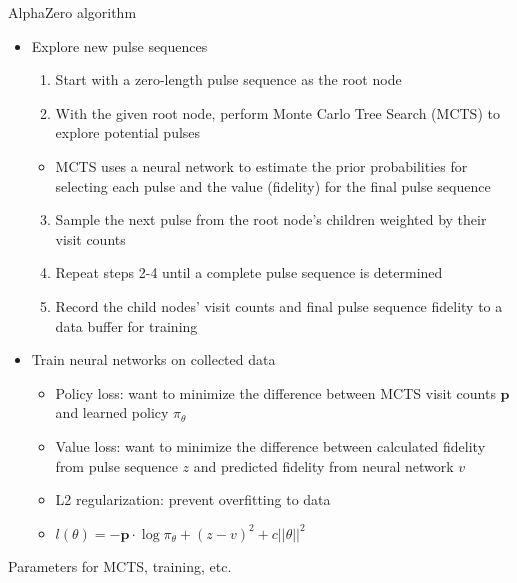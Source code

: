 \documentclass{beamer}
\begin{document}
\begin{frame}{AlphaZero algorithm}

\begin{itemize}

\item
  Explore new pulse sequences

  \begin{enumerate}
  
  \item
    Start with a zero-length pulse sequence as the root node
  \item
    With the given root node, perform Monte Carlo Tree Search (MCTS) to
    explore potential pulses
  \end{enumerate}

  \begin{itemize}
  
  \item
    MCTS uses a neural network to estimate the prior probabilities for
    selecting each pulse and the value (fidelity) for the final pulse
    sequence
  \end{itemize}

  \begin{enumerate}
  \setcounter{enumi}{2}
  
  \item
    Sample the next pulse from the root node's children weighted by
    their visit counts
  \item
    Repeat steps 2-4 until a complete pulse sequence is determined
  \item
    Record the child nodes' visit counts and final pulse sequence
    fidelity to a data buffer for training
  \end{enumerate}
\item
  Train neural networks on collected data

  \begin{itemize}
  
  \item
    Policy loss: want to minimize the difference between MCTS visit
    counts \(\mathbf{p}\) and learned policy \(\pi_\theta\)
  \item
    Value loss: want to minimize the difference between calculated
    fidelity from pulse sequence \(z\) and predicted fidelity from
    neural network \(v\)
  \item
    L2 regularization: prevent overfitting to data
  \item
    \(l(\theta) = -\mathbf{p} \cdot \log\pi_\theta + (z - v)^2 + c||\theta||^2\)
  \end{itemize}
\end{itemize}

Parameters for MCTS, training, etc.
\end{frame}
\end{document}
